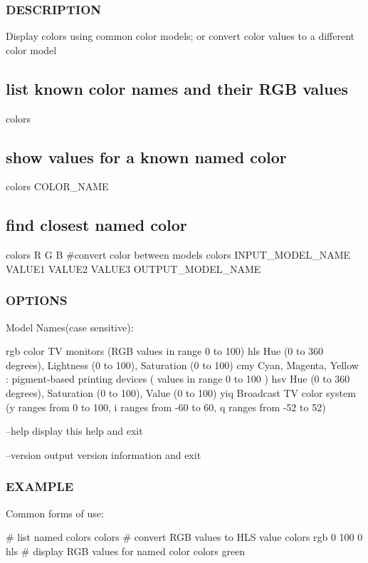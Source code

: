 \subsubsection*{D\+E\+S\+C\+R\+I\+P\+T\+I\+ON}

Display colors using common color models; or convert color values to a different color model

\subsection*{list known color names and their R\+GB values}

colors \subsection*{show values for a known named color}

colors C\+O\+L\+O\+R\+\_\+\+N\+A\+ME \subsection*{find closest named color}

colors R G B \#convert color between models colors I\+N\+P\+U\+T\+\_\+\+M\+O\+D\+E\+L\+\_\+\+N\+A\+ME V\+A\+L\+U\+E1 V\+A\+L\+U\+E2 V\+A\+L\+U\+E3 O\+U\+T\+P\+U\+T\+\_\+\+M\+O\+D\+E\+L\+\_\+\+N\+A\+ME

\subsubsection*{O\+P\+T\+I\+O\+NS}

Model Names(case sensitive)\+:

rgb color TV monitors (R\+GB values in range 0 to 100) hls Hue (0 to 360 degrees), Lightness (0 to 100), Saturation (0 to 100) cmy Cyan, Magenta, Yellow \+: pigment-\/based printing devices ( values in range 0 to 100 ) hsv Hue (0 to 360 degrees), Saturation (0 to 100), Value (0 to 100) yiq Broadcast TV color system (y ranges from 0 to 100, i ranges from -\/60 to 60, q ranges from -\/52 to 52)

--help display this help and exit

--version output version information and exit

\subsubsection*{E\+X\+A\+M\+P\+LE}

\begin{DoxyVerb} Common forms of use:

  # list named colors
  colors
  # convert RGB values to HLS value
  colors rgb 0 100 0 hls
  # display RGB values for named color
  colors green \end{DoxyVerb}
 

